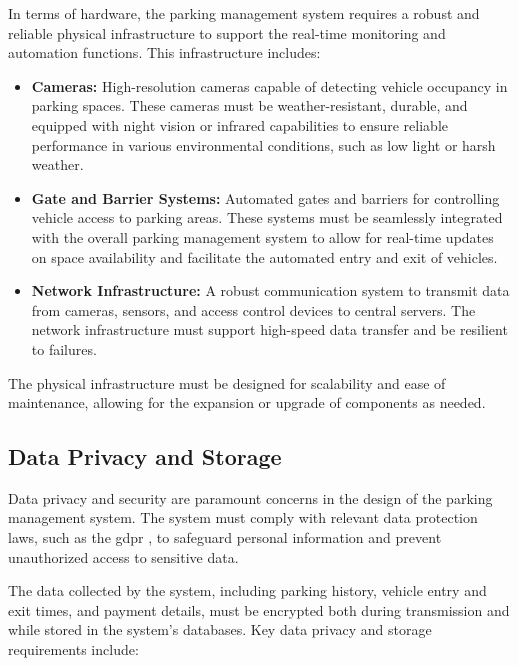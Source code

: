 In terms of hardware, the parking management system requires a robust and reliable physical infrastructure to support the real-time monitoring and automation functions. This infrastructure includes:

\begin{itemize}
	\item \textbf{Cameras:} High-resolution cameras capable of detecting vehicle occupancy in parking spaces. These cameras must be weather-resistant, durable, and equipped with night vision or infrared capabilities to ensure reliable performance in various environmental conditions, such as low light or harsh weather.
	\item \textbf{Gate and Barrier Systems:} Automated gates and barriers for controlling vehicle access to parking areas. These systems must be seamlessly integrated with the overall parking management system to allow for real-time updates on space availability and facilitate the automated entry and exit of vehicles.
	\item \textbf{Network Infrastructure:} A robust communication system to transmit data from cameras, sensors, and access control devices to central servers. The network infrastructure must support high-speed data transfer and be resilient to failures.
\end{itemize}

The physical infrastructure must be designed for scalability and ease of maintenance, allowing for the expansion or upgrade of components as needed.

\subsection{Data Privacy and Storage}

Data privacy and security are paramount concerns in the design of the parking management system. The system must comply with relevant data protection laws, such as the \gls{gdpr} \autocite{gdpr}, to safeguard personal information and prevent unauthorized access to sensitive data.

The data collected by the system, including parking history, vehicle entry and exit times, and payment details, must be encrypted both during transmission and while stored in the system’s databases. Key data privacy and storage requirements include:


